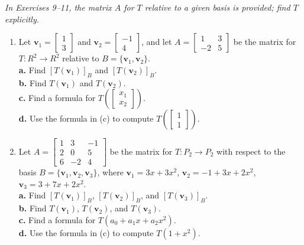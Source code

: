 \documentclass{article}
\begin{document}
\noindent\textit{In Exercises 9--11, the matrix $A$ for $T$ relative to a given basis is
provided; find $T$ explicitly.}

\begin{enumerate}
  \item[9.] Let $\mathbf{v}_1 = \begin{bmatrix}1\\3\end{bmatrix}$ and
        $\mathbf{v}_2 = \begin{bmatrix}-1\\4\end{bmatrix}$, and let
        $A = \begin{bmatrix}1&3\\-2&5\end{bmatrix}$ be the matrix for
        $T : R^2 \to R^2$ relative to $B = \{\mathbf{v}_1,\mathbf{v}_2\}$.\\
        \textbf{a.} Find $[T(\mathbf{v}_1)]_B$ and $[T(\mathbf{v}_2)]_B$.\\
        \textbf{b.} Find $T(\mathbf{v}_1)$ and $T(\mathbf{v}_2)$.\\
        \textbf{c.} Find a formula for $T\!\left(\begin{bmatrix}x_1\\x_2\end{bmatrix}\right)$.\\
        \textbf{d.} Use the formula in (c) to compute $T\!\left(\begin{bmatrix}1\\1\end{bmatrix}\right)$.

  \item[11.] Let $A = \begin{bmatrix}1&3&-1\\2&0&5\\6&-2&4\end{bmatrix}$ be the matrix for
        $T : P_2 \to P_2$ with respect to the basis $B = \{\mathbf{v}_1,\mathbf{v}_2,\mathbf{v}_3\}$,
        where $\mathbf{v}_1 = 3x+3x^2$, $\mathbf{v}_2 = -1+3x+2x^2$, $\mathbf{v}_3 = 3+7x+2x^2$.\\
        \textbf{a.} Find $[T(\mathbf{v}_1)]_B$, $[T(\mathbf{v}_2)]_B$, and $[T(\mathbf{v}_3)]_B$.\\
        \textbf{b.} Find $T(\mathbf{v}_1)$, $T(\mathbf{v}_2)$, and $T(\mathbf{v}_3)$.\\
        \textbf{c.} Find a formula for $T(a_0+a_1x+a_2x^2)$.\\
        \textbf{d.} Use the formula in (c) to compute $T(1+x^2)$.

\end{enumerate}
\end{document}
